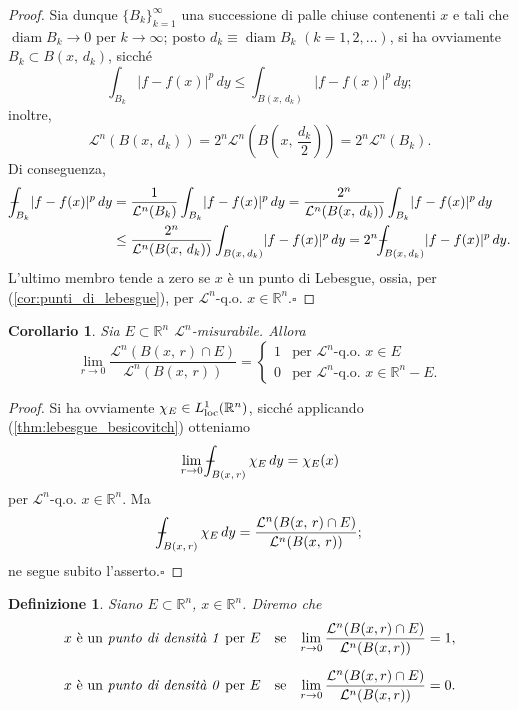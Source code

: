 \documentclass[a4paper,10pt,openright,oneside]{book}
\theoremstyle{theoremstyle}
\newtheorem{corollario}[teorema]{Corollario}
\theoremstyle{theoremstylewoheader}
\theoremstyle{theoremstyle}
\newtheorem{definizione}[teorema]{Definizione}
\theoremstyle{proofsecstyle}
\theoremstyle{nonumberplain}
\newtheorem{proof}{Dim.}
\newcommand{\RR}{\ensuremath{\mathbb{R}}}
\newcommand{\Leb}{\ensuremath{\mathcal{L}}}
\newcommand{\abs}[1]{\ensuremath{\lvert #1 \rvert}}
\newcommand{\qogni}[2]{\ensuremath{#2\text{-q.o. $\!#1$}}}
\def\Xint#1{\mathchoice
	{\XXint\displaystyle\textstyle{#1}}%
	{\XXint\textstyle\scriptstyle{#1}}%
	{\XXint\scriptstyle\scriptscriptstyle{#1}}%
	{\XXint\scriptscriptstyle\scriptscriptstyle{#1}}%
	\!\int}
\def\XXint#1#2#3{{\setbox0=\hbox{$#1{#2#3}{\int}$}
	\vcenter{\hbox{$#2#3$}}\kern-.5\wd0}}
\def\dashint{\Xint-}
\DeclareMathOperator{\diam}{diam}
\renewcommand{\qedsymbol}{\ensuremath{\square}}
\newcommand{\qed}{\unskip\nobreak\hfill\nobreak\hspace{.5em}\qedsymbol}
\begin{document}
\begin{proof}
Sia dunque $\{B_k\}_{k=1}^\infty$ una successione di palle chiuse contenenti $x$ e tali che $\diam B_k \to 0$ per $k \to \infty$; posto $d_k \equiv \diam B_k$ $(k = 1, 2, \ldots)$, si ha ovviamente $B_k \subset B(x,\, d_k)$, sicché
\[
\int_{B_k} \abs{f - f(x)}^p\, dy \le \int_{B(x,\, d_k)} \abs{f - f(x)}^p\, dy;
\]
inoltre,
\[
\Leb^n(B(x,\, d_k)) = 2^n\Leb^n\left(B\left(x,\, \frac{d_k}{2}\right)\right) = 2^n\Leb^n(B_k).
\]
Di conseguenza,
\begin{align*}
\dashint_{B_k} \abs{f - f(x)}^p\, dy &= \frac{1}{\Leb^n(B_k)} \int_{B_k} \abs{f - f(x)}^p\, dy = \frac{2^n}{\Leb^n(B(x,\, d_k))} \int_{B_k} \abs{f - f(x)}^p\, dy\\
&\le \frac{2^n}{\Leb^n(B(x,\, d_k))} \int_{B(x,\, d_k)} \abs{f - f(x)}^p\, dy = 2^n\dashint_{B(x,\, d_k)} \abs{f - f(x)}^p\, dy.
\end{align*}
L'ultimo membro tende a zero se $x$ è un punto di Lebesgue, ossia, per (\ref{cor:punti_di_lebesgue}), per $\qogni{x \in \RR^n}{\Leb^n}$.\qed
\end{proof}

\begin{corollario}
Sia $E \subset \RR^n$ $\Leb^n$-misurabile. Allora
\[
\lim_{r \to 0} \frac{\Leb^n(B(x,\, r) \cap E)}{\Leb^n(B(x,\, r))} = \begin{cases}
1 & \text{per $\qogni{x \in E}{\Leb^n}$}\\
0 & \text{per $\qogni{x \in \RR^n - E}{\Leb^n}$.}
\end{cases}
\]
\end{corollario}

\begin{proof}
Si ha ovviamente $\chi_E \in L_\textup{loc}^1(\RR^n)$, sicché applicando (\ref{thm:lebesgue_besicovitch}) otteniamo
\[
\lim_{r \to 0} \dashint_{B(x,\, r)} \chi_E\, dy = \chi_E(x)
\]
per $\qogni{x \in \RR^n}{\Leb^n}$. Ma
\[
\dashint_{B(x,\, r)} \chi_E\, dy = \frac{\Leb^n(B(x,\, r) \cap E)}{\Leb^n(B(x,\, r))};
\]
ne segue subito l'asserto.\qed
\end{proof}

\begin{definizione}
\label{def:punti_di_densita}
Siano $E \subset \RR^n$, $x \in \RR^n$. Diremo che
\[
\begin{array}{ccc}
\text{$x$ è un \emph{punto di densità 1}\/ per $E$\index{punto!di densità 1}} & \text{se} & \displaystyle\lim_{r \to 0} \frac{\Leb^n(B(x,r) \cap E)}{\Leb^n(B(x,r))} = 1,\\
\noalign{\vskip10pt}\text{$x$ è un \emph{punto di densità 0}\/ per $E$\index{punto!di densità 0}} & \text{se} & \displaystyle\lim_{r \to 0} \frac{\Leb^n(B(x,r) \cap E)}{\Leb^n(B(x,r))} = 0.
\end{array}
\]
\end{definizione}
\end{document}
